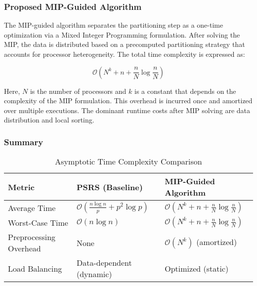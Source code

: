 \documentclass[]{interact}
\theoremstyle{plain}
\theoremstyle{definition}
\theoremstyle{remark}
\begin{document}
\subsubsection{Proposed MIP-Guided Algorithm}

The MIP-guided algorithm separates the partitioning step as a one-time optimization via a Mixed Integer Programming formulation. After solving the MIP, the data is distributed based on a precomputed partitioning strategy that accounts for processor heterogeneity. The total time complexity is expressed as:

\begin{equation}
    \mathcal{O}\left(N^k + n + \frac{n}{N} \log \frac{n}{N}\right)
\end{equation}

Here, $N$ is the number of processors and $k$ is a constant that depends on the complexity of the MIP formulation. This overhead is incurred once and amortized over multiple executions. The dominant runtime costs after MIP solving are data distribution and local sorting.

\subsubsection{Summary}

\begin{table}[H]
\centering
\caption{Asymptotic Time Complexity Comparison}
\begin{tabular}{l|l|l}
\toprule
\textbf{Metric} & \textbf{PSRS (Baseline)} & \textbf{MIP-Guided Algorithm} \\
\midrule
Average Time & $\mathcal{O}\left(\frac{n \log n}{p} + p^2 \log p\right)$ & $\mathcal{O}\left(N^k + n + \frac{n}{N} \log \frac{n}{N}\right)$ \\
Worst-Case Time & $\mathcal{O}(n \log n)$ & $\mathcal{O}\left(N^k + n + \frac{n}{N} \log \frac{n}{N}\right)$ \\
Preprocessing Overhead & None & $\mathcal{O}(N^k)$ (amortized) \\
Load Balancing & Data-dependent (dynamic) & Optimized (static) \\
\bottomrule
\end{tabular}
\end{table}
\end{document}
